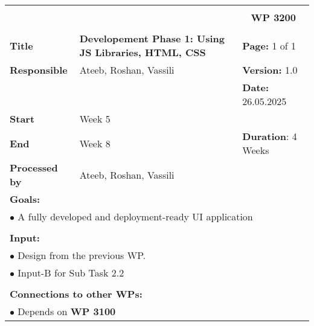 \begin{table}[!h]
    \begin{center}
        \begin{tabular}{|p{}||p{}|p{}||p{}|}
            \hline
            \multicolumn{3}{|l||}{\textbf{}} & \multicolumn{1}{c|}{}\\
            \multicolumn{3}{|l||}{\textbf{}} & \multicolumn{1}{c|}{\textbf{WP 3200}}\\
            \multicolumn{3}{|l||}{\textbf{}} & \multicolumn{1}{c|}{}\\
            \hline\hline
            \textbf{Title} & \multicolumn{2}{p{.40\columnwidth}||}{\textbf{Developement Phase 1: Using JS Libraries, HTML, CSS}}
            & \textbf{Page:} 1 of 1\\
            \hline
            \textbf{Responsible} & \multicolumn{2}{l||}{Ateeb, Roshan, Vassili} & \textbf{Version:} 1.0\\
            \hline
            \multicolumn{3}{|l||}{} & \textbf{Date:} 26.05.2025 \\
            \hline\hline
            \textbf{Start} & \multicolumn{2}{l||}{Week 5} & \\
            \hline
            \textbf{End} & \multicolumn{2}{l||}{Week 8} & \textbf{Duration}: 4 Weeks\\
            \hline\hline
            \textbf{Processed by} & \multicolumn{3}{l|}{Ateeb, Roshan, Vassili}\\
            \hline\hline
            \multicolumn{4}{|p{.95\columnwidth}|}{\textbf{Goals:}}\\
            \multicolumn{4}{|p{.95\columnwidth}|}{$\bullet$ A fully developed and deployment-ready UI application}\\
            \multicolumn{4}{|p{.95\columnwidth}|}{}\\
            \multicolumn{4}{|p{.95\columnwidth}|}{\textbf{Input:}}\\
            \multicolumn{4}{|p{.95\columnwidth}|}{$\bullet$ Design from the previous WP.}\\
            \multicolumn{4}{|p{.95\columnwidth}|}{$\bullet$ Input-B for Sub Task 2.2}\\
            \multicolumn{4}{|p{.95\columnwidth}|}{}\\
            \multicolumn{4}{|p{.95\columnwidth}|}{\textbf{Connections to other WPs:}}\\
            \multicolumn{4}{|p{.95\columnwidth}|}{$\bullet$ Depends on \textbf{WP 3100}}\\

\end{tabular}
\end{center}
\end{table}
